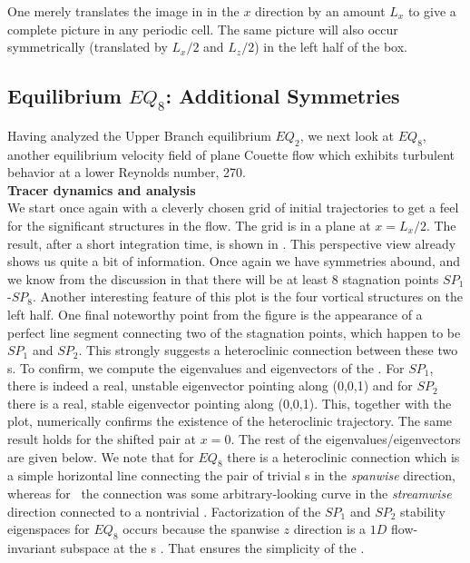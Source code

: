 \documentclass[letter,12pt,openany]{article}
\begin{document}
 One merely translates the image in  in the
 $x$ direction by an amount $L_{x}$ to give a complete picture in
 any periodic cell. The same picture will also occur symmetrically
 (translated by $L_{x}/2$ and $L_{z}/2$) in the left half of the
 box.
  
 





   \subsection{Equilibrium $EQ_8$: Additional Symmetries}
   \label{sect:EQ8}

   Having analyzed the Upper Branch equilibrium $EQ_2$, we next look at $EQ_8$, another equilibrium velocity field of plane Couette flow which exhibits turbulent behavior at a lower Reynolds number, 270. \\



\noindent \textbf{Tracer dynamics and analysis} \\


 We start once again with a cleverly chosen grid of initial
 trajectories to get a feel for the significant structures in the
 flow. The grid is
 in a plane at $x = L_{x}/2$. The result, after a short integration
 time, is shown in . This perspective
 view already shows us quite a bit of information. Once again we
 have symmetries abound, and we know from the discussion in  that there will be at least 8 stagnation points $SP_1$-$SP_8$.  Another interesting feature of this
 plot is the four vortical structures on the left half. One final noteworthy point
  from the figure is the appearance of a perfect line segment connecting two of the
 stagnation points, which happen to be $SP_1$ and $SP_2$. 
  This strongly suggests a heteroclinic
 connection between these two \stagp s. To confirm, we
 compute the eigenvalues and eigenvectors of the \velgradmat. For
 $SP_1$, there is
 indeed a real, unstable eigenvector pointing along (0,0,1) and for
 $SP_2$ there is a real, stable eigenvector pointing along (0,0,1).
 This, together with the plot, numerically confirms the existence of the heteroclinic trajectory. The same result  holds for the shifted pair at $x = 0$. The rest of the eigenvalues/eigenvectors are given
 below. We note that for $EQ_8$ there is a heteroclinic connection which is a simple
 horizontal line connecting the pair of trivial \stagp s in the
 \textit{spanwise} direction, whereas for \tUB\ the connection was some
 arbitrary-looking curve in the \textit{streamwise} direction connected to a nontrivial
 \stagp. Factorization of the 
$SP_1$ and $SP_2$ stability eigenspaces for $EQ_8$ occurs because the spanwise $z$ direction is a $1D$ flow-invariant subspace at
the \stagp s \cite{SiCvi10}. That ensures the simplicity of the \hec.
\end{document}
